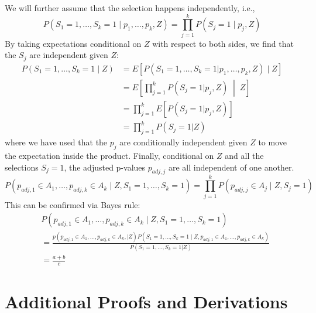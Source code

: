 \documentclass{article}
\begin{document}
\begin{appendix}
We will further assume that the selection happens independently, i.e., 
\begin{equation*}
    P(S_1 = 1, \dots, S_k = 1 \mid p_1, \dots, p_k, Z) = \prod_{j = 1}^k P(S_j = 1 \mid p_j, Z)
\end{equation*} 
By taking expectations conditional on $Z$ with respect to both sides, we find that the $S_j$ are independent given $Z$:
\begin{align*}
    P(S_1 = 1, \dots, S_k = 1 \mid Z) &= E[P(S_1 = 1, \dots, S_k = 1 | p_1, \dots, p_k, Z) \mid Z] \\
    &= E \left[\prod_{j = 1}^k P(S_j = 1 | p_j, Z) \;\middle|\; Z\right]\\
    &= \prod_{j=1}^k E[P(S_j = 1 | p_j, Z)]\\
    &= \prod_{j=1}^k P(S_j = 1 | Z)
\end{align*}
where we have used that the $p_j$ are conditionally independent given $Z$ to move the expectation inside the product. Finally, conditional on $Z$ and all the selections $S_j=1$, the adjusted p-values $p_{adj, j}$ are all independent of one another. 
\begin{equation*}
    P(p_{adj, 1} \in A_1, \dots, p_{adj, k} \in A_k \mid Z, S_1 = 1, \dots, S_k = 1) = \prod_{j=1}^k P(p_{adj, j} \in A_j \mid Z, S_j = 1)
\end{equation*}
This can be confirmed via Bayes rule:
\begin{align*}
    &P(p_{adj, 1} \in A_1, \dots, p_{adj, k} \in A_k \mid Z, S_1 = 1, \dots, S_k = 1) \\
    &= \frac{p(p_{adj, 1} \in A_1, \dots, p_{adj, k} \in A_k, | Z) P( S_1 = 1, \dots, S_k = 1 \mid Z, p_{adj, 1} \in A_1, \dots, p_{adj, k} \in A_k)  }{P(S_1=1, \dots, S_k = 1 | Z)}\\
    &= \frac{a + b}{c}
\end{align*}


\section{Additional Proofs and Derivations}
\label{sec:proofs_appdx}


\end{appendix}
\end{document}
